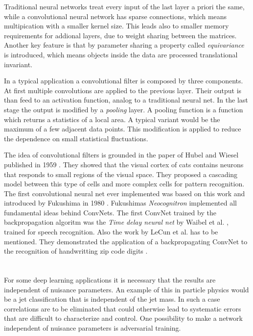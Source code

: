 \documentclass[12pt, a4paper]{thesis}
\begin{document}
Traditional neural networks treat every input of the last layer a
priori the same, while a convolutional neural network has sparse
connections, which means multipication with a smaller kernel
size. This leads also to smaller memory requirements for addional
layers, due to weight sharing between the matrices.  Another key
feature is that by parameter sharing a property called
\emph{equivariance} is introduced, which means objects inside the data
are processed translational invariant.

In a typical application a convolutional filter is composed by three
components.  At first multiple convolutions are applied to the
previous layer. Their output is than feed to an activation function,
analog to a traditional neural net.  In the last stage the output is
modified by a \emph{pooling} layer. A pooling function is a function
which returns a statistics of a local area. A typical variant would be
the maximum of a few adjacent data points. This modification is
applied to reduce the dependence on small statistical fluctuations.

The idea of convolutional filters is grounded in the paper of Hubel
and Wiesel published in 1959 \cite{hubel59}. They showed that the
visual cortex of cats contains neurons that responds to small regions
of the visual space. They proposed a cascading model between this type
of cells and more complex cells for pattern recognition. The first
convolutional neural net ever implemented was based on this work and
introduced by Fukushima in 1980 \cite{neocognitron}. Fukushimas
\emph{Neocognitron} implemented all fundamental ideas behind ConvNets.
The first ConvNet trained by the backpropagation algoritm was the
\emph{Time delay neural net} by Waibel et al.
\cite{hampshire89,waibel90}, trained for speech recognition. Also the
work by LeCun et al. has to be mentioned. They demonstrated the
application of a backpropagating ConvNet to the recognition of
handwritting zip code digits \cite{lecun89}.

\section{}

For some deep learning applications it is necessary that the results
are independent of nuisance parameters. An example of this in particle
physics would be a jet classification that is independent of the jet
mass. In such a case correlations are to be eliminated that could
otherwise lead to systematic errors that are difficult to characterize
and control. One possibility to make a network independent of nuisance
parameters is adversarial training.
\end{document}
